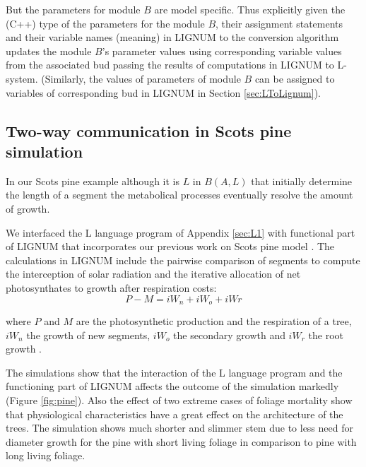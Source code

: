 But the parameters for module $B$ are model specific.  Thus explicitly
given  the (C++)  type of  the parameters  for the  module  $B$, their
assignment statements and their  variable names (meaning) in LIGNUM to
the  conversion algorithm  updates the  module $B$'s  parameter values
using corresponding  variable values  from the associated  bud passing
the results  of computations in  LIGNUM to L-system.   (Similarly, the
values of  parameters of  module $B$ can  be assigned to  variables of
corresponding bud in LIGNUM in Section \ref{sec:LToLignum}).

\subsection{Two-way communication in Scots pine simulation}

In  our  Scots  pine example  although  it  is  $L$ in  $B(A,L)$  that
initially determine the length  of a segment the metabolical processes
eventually resolve the amount of growth.
  
We  interfaced the L  language program  of Appendix  \ref{sec:L1} with
functional part of LIGNUM that incorporates our previous work on Scots
pine  model \citep{perttunen:96,  perttunen:98}.  The  calculations in
LIGNUM  include the  pairwise comparison  of segments  to  compute the
interception of  solar radiation and  the iterative allocation  of net
photosynthates to growth after respiration costs: 
\begin{equation} 
P - M  = iW_n  +  iW_o +  iWr 
\end{equation}  

where  $P$   and  $M$  are  the  photosynthetic   production  and  the
respiration of a  tree, $iW_n$ the growth of  new segments, $iW_o$ the
secondary      growth     and      $iW_r$     the      root     growth
\citep[c.f.][]{perttunen:96,perttunen:01}.

The simulations  show that the  interaction of the L  language program
and  the  functioning  part  of  LIGNUM affects  the  outcome  of  the
simulation markedly  (Figure \ref{fig:pine}).  Also the effect  of two
extreme   cases   of  foliage   mortality   show  that   physiological
characteristics have a great effect  on the architecture of the trees.
The simulation  shows much shorter and  slimmer stem due  to less need
for  diameter  growth  for  the  pine with  short  living  foliage  in
comparison to pine with long living foliage.

